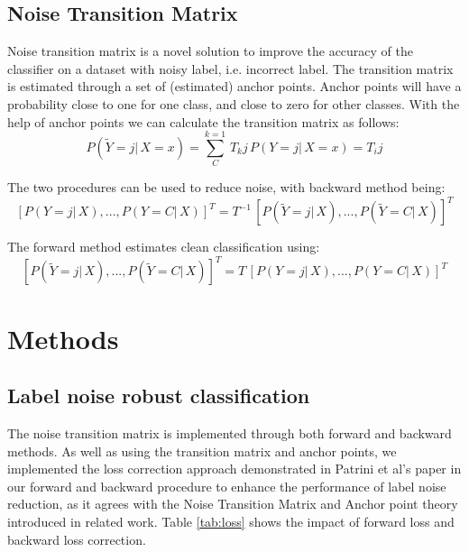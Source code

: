 \documentclass{article} %
\begin{document}
\subsection{Noise Transition Matrix}
Noise transition matrix is a novel solution to improve the accuracy of the classifier on a dataset with noisy label, i.e. incorrect label. The transition matrix is estimated through a set of (estimated) anchor points. Anchor points will have a probability close to one for one class, and close to zero for other classes. With the help of anchor points we can calculate the transition matrix as follows: \cite{Dummy:8}
\begin{equation}
P\left ( \tilde{Y} = j |\, X = x\right ) = \sum_{C}^{k=1}\, T_kj\, P\left ( Y = j |\, X = x\right ) = T_ij
\end{equation}

The two procedures can be used to reduce noise, with backward method being:
\begin{equation}
\left [ P\left ( Y = j |\, X\right ),...,P\left ( Y = C |\, X\right ) \right]^{T} = T^{-1}\,\left [ P\left ( \tilde{Y} = j |\, X\right ),...,P\left ( \tilde{Y} = C |\, X\right ) \right]^{T}
\end{equation}

The forward method estimates clean classification using:
\begin{equation}
\left [ P\left ( \tilde{Y} = j |\, X\right ),...,P\left ( \tilde{Y} = C |\, X\right ) \right]^{T} = T\,\left [ P\left ( Y = j |\, X\right ),...,P\left ( Y = C |\, X\right ) \right]^{T}
\end{equation}


\section{Methods}
\subsection{Label noise robust classification}
The noise transition matrix is implemented through both forward and backward methods. As well as using the transition matrix and anchor points, we implemented the loss correction approach demonstrated in Patrini et al's paper in our forward and backward procedure to enhance the performance of label noise reduction, as it agrees with the Noise Transition Matrix and Anchor point theory introduced in related work. Table \ref{tab:loss} shows the impact of forward loss and backward loss correction.
\end{document}
